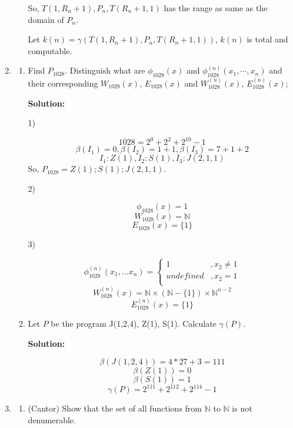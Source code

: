 \documentclass[12pt,a4paper]{article}
\theoremstyle{definition}
\numberwithin{equation}{section}
\numberwithin{figure}{section}
\begin{document}
\begin{enumerate}
\begin{enumerate}
      So, $T(1,R_n+1), P_n, T(R_n+1,1)$ has the range as same as the domain of $P_n$.
      
      Let $k(n) = \gamma(T(1,R_n+1),P_n,T(R_n+1,1))$, $k(n)$ is total and computable.    
      
    \end{enumerate}

  \item
  \begin{enumerate}
    \item Find $P_{1028}$. Distinguish what are $\phi_{1028}(x)$ and $\phi_{1028}^{(n)}(x_1,\cdots,x_n)$ and their corresponding $W_{1028}(x)$, $E_{1028}(x)$ and $W^{(n)}_{1028}(x)$, $E^{(n)}_{1028}(x)$;
    
    \textbf{Solution:}
    
    1)
    
    $$1028 = 2^{0} + 2^{2} + 2^{10}-1$$
    $$ \beta({I_1}) = 0 , \beta({I_2}) = 1 + 1, \beta({I_3}) = 7 + 1 + 2 $$
    $$ I_1:Z(1), I_2:S(1), I_3: J(2,1,1)$$
    So, $P_{1028} = Z(1);S(1);J(2,1,1).$
    
    2)
    
    
    $$\phi_{1028}(x) = 1$$
    $$W_{1028}(x) = \mathbb{N}$$
    $$E_{1028}(x) = \{ 1\} $$
    
    3)
    
    $$\phi_{1028}^{(n)}(x_1,...x_n) = \begin{cases} 1 &, x_2 \neq 1\\ undefined &, x_2 = 1 \\ \end{cases}$$
    $$W_{1028}^{(n)}(x) = \mathbb{N} \times (\mathbb{N}-\{1\}) \times \mathbb{N}^{n-2}$$
    $$E_{1028}^{(n)}(x) = \{ 1\} $$
    
    \item Let $P$ be the program J(1,2,4), Z(1), S(1). Calculate $\gamma(P)$.
    
    \textbf{Solution:}
    
    $$\beta(J(1,2,4)) = 4*27 + 3 = 111$$
    $$\beta(Z(1)) = 0 $$
    $$\beta(S(1)) = 1$$
    $$\gamma(P) = 2^{111} + 2^{112} + 2^{114} - 1$$
    
  \end{enumerate}
\item

\begin{enumerate}
\item (Cantor) Show that the set of all functions from $\mathbb{N}$ to $\mathbb{N}$ is not denumerable.


\end{enumerate}
\end{enumerate}
\end{document}
